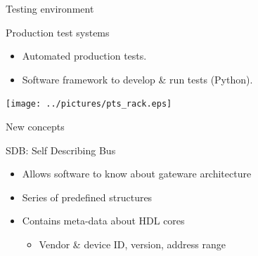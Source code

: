 \documentclass[compress,red]{beamer}
\begin{document}
\begin{frame}{Testing environment}

  \begin{block}{Production test systems}
    \begin{itemize}
    \item Automated production tests.
    \item Software framework to develop \& run tests (Python).
    \end{itemize}
  \end{block}

   \begin{center}
    \texttt{[image: ../pictures/pts\_rack.eps]}
  \end{center}



  \note[item]{}

\end{frame}

\begin{frame}{New concepts}

  \begin{block}{SDB: Self Describing Bus}
    \begin{itemize}
    \item Allows software to know about gateware architecture
    \item Series of predefined structures
    \item Contains meta-data about HDL cores
      \begin{itemize}
      \item Vendor \& device ID, version, address range
      \end{itemize}
    \end{itemize}
  \end{block}

  \note[item]{}

\end{frame}
\end{document}
